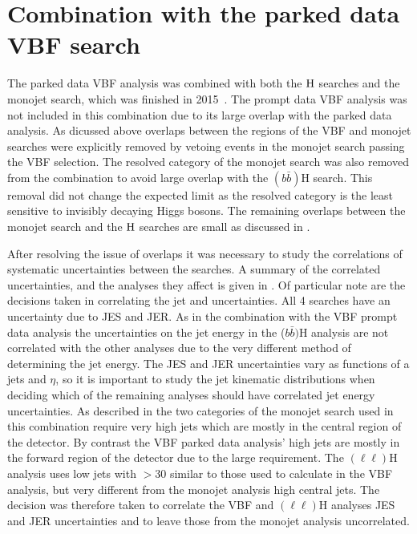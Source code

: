 \section{Combination with the parked data VBF search}
\label{sec:combparked}
The parked data \ac{VBF} analysis was combined with both the \PZ$\rm{H}$ searches and the monojet search, which was finished in 2015~\cite{CMS-PAS-HIG-15-012}. The prompt data \ac{VBF} analysis was not included in this combination due to its large overlap with the parked data analysis. As dicussed above overlaps between the regions of the \ac{VBF} and monojet searches were explicitly removed by vetoing events in the monojet search passing the \ac{VBF} selection. The resolved category of the monojet search was also removed from the combination to avoid large overlap with the \PZ$(b\bar{b})$H search. This removal did not change the expected limit as the resolved category is the least sensitive to invisibly decaying Higgs bosons. The remaining overlaps between the monojet search and the \PZ$\rm{H}$ searches are small as discussed in .

After resolving the issue of overlaps it was necessary to study the correlations of systematic uncertainties between the searches. A summary of the correlated uncertainties, and the analyses they affect is given in . Of particular note are the decisions taken in correlating the jet and \MET uncertainties. All 4 searches have an uncertainty due to \ac{JES} and \ac{JER}. As in the combination with the \ac{VBF} prompt data analysis the uncertainties on the jet energy in the \PZ($b\bar{b})$H analysis are not correlated with the other analyses due to the very different method of determining the jet energy. The \ac{JES} and \ac{JER} uncertainties vary as functions of a jets \pt and $\eta$, so it is important to study the jet kinematic distributions when deciding which of the remaining analyses should have correlated jet energy uncertainties. As described in  the two categories of the monojet search used in this combination require very high \pt jets which are mostly in the central region of the detector. By contrast the \ac{VBF} parked data analysis' high \pt jets are mostly in the forward region of the detector due to the large \detajj requirement. The \PZ$(\ell\ell)$H analysis uses low \pt jets with \pt$>30$ \GeV similar to those used to calculate \jetmetdphi in the \ac{VBF} analysis, but very different from the monojet analysis high \pt central jets. The decision was therefore taken to correlate the \ac{VBF} and \PZ$(\ell\ell)$H analyses \ac{JES} and \ac{JER} uncertainties and to leave those from the monojet analysis uncorrelated.

